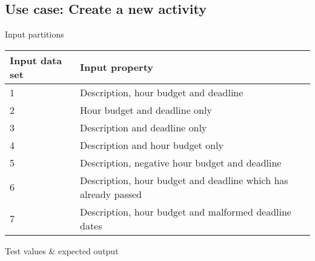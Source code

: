 \subsection{Use case: Create a new activity}

Input partitions
\begin{center}
  \begin{tabular}{| l | l |}
    \hline
	Input data set & Input property \\ \hline
    1 & Description, hour budget and deadline \\ \hline
    2 & Hour budget and deadline only \\ \hline
    3 & Description and deadline only \\ \hline
    4 & Description and hour budget only \\ \hline
    5 & Description, negative hour budget and deadline  \\ \hline
    6 & Description, hour budget and deadline which has already passed \\ \hline
    7 & Description, hour budget and malformed deadline dates \\ \hline
  \end{tabular}
\end{center}

Test values \& expected output

